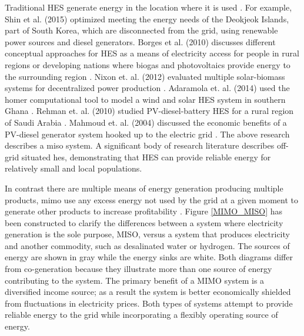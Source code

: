 Traditional HES generate energy in the location where it is used \cite {Shin2015, Nixon2012, Adaramola2014, Goodbody2013, McGowan1996}. For example, Shin et al. (2015) optimized meeting the energy needs of the Deokjeok Islands, part of South Korea, which are disconnected from the grid, using renewable power sources and diesel generators. Borges et al. (2010) discusses different conceptual approaches for HES as a means of electricity access for people in rural regions or developing nations where biogas and photovoltaics provide energy to the surrounding region \cite{BorgesNeto2010}. Nixon et. al. (2012) evaluated multiple solar-biomass systems for decentralized power production \cite{Nixon2012}. Adaramola et. al. (2014) used the \ac{homer}  computational tool to model a wind and solar HES system in southern Ghana \cite{Adaramola2014}. Rehman et. al. (2010) studied PV-diesel-battery HES for a rural region of Saudi Arabia \cite{Rehman2010}. Mahmoud et. al. (2004) discussed the economic benefits of a PV-diesel generator system hooked up to the electric grid \cite {Mahmoud2004}. The above research describes a \ac{miso} system\cite{Garcia2013}. A significant body of research literature describes off-grid situated \ac{hes}, demonstrating that HES can provide reliable energy for relatively small and local populations.

In contrast there are multiple means of energy generation producing multiple products, \ac{mimo} use any excess energy not used by the grid at a given moment to generate other products to increase profitability \cite {Garcia2013}. Figure \ref{MIMO_MISO} has been constructed to clarify the differences between a system where electricity generation is the sole purpose, MISO, versus a system that produces electricity and another commodity, such as desalinated water or hydrogen. The sources of energy are shown in gray while the energy sinks are white. Both diagrams differ from co-generation because they illustrate more than one source of energy contributing to the system. The primary benefit of a MIMO system is a diversified income source; as a result the system is better economically shielded from fluctuations in electricity prices. Both types of systems attempt to provide reliable energy to the grid while incorporating a flexibly operating source of energy.

